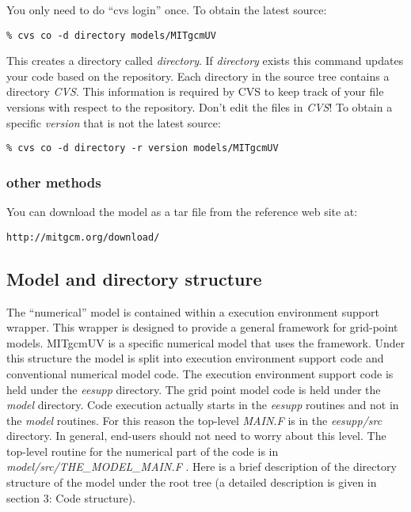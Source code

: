 You only need to do ``cvs login'' once. To obtain the latest source:
\begin{verbatim}
% cvs co -d directory models/MITgcmUV
\end{verbatim}

This creates a directory called \textit{directory}. If \textit{directory}
exists this command updates your code based on the repository. Each
directory in the source tree contains a directory \textit{CVS}. This
information is required by CVS to keep track of your file versions with
respect to the repository. Don't edit the files in \textit{CVS}! To obtain a
specific \textit{version} that is not the latest source:
\begin{verbatim}
% cvs co -d directory -r version models/MITgcmUV
\end{verbatim}

\subsubsection{other methods}

You can download the model as a tar file from the reference web site at:
\begin{verbatim}
http://mitgcm.org/download/
\end{verbatim}

\subsection{Model and directory structure}

The ``numerical'' model is contained within a execution environment support
wrapper. This wrapper is designed to provide a general framework for
grid-point models. MITgcmUV is a specific numerical model that uses the
framework. Under this structure the model is split into execution
environment support code and conventional numerical model code. The
execution environment support code is held under the \textit{eesupp}
directory. The grid point model code is held under the \textit{model}
directory. Code execution actually starts in the \textit{eesupp} routines
and not in the \textit{model} routines. For this reason the top-level 
\textit{MAIN.F} is in the \textit{eesupp/src} directory. In general,
end-users should not need to worry about this level. The top-level routine
for the numerical part of the code is in \textit{model/src/THE\_MODEL\_MAIN.F%
}. Here is a brief description of the directory structure of the model under
the root tree (a detailed description is given in section 3: Code structure).

